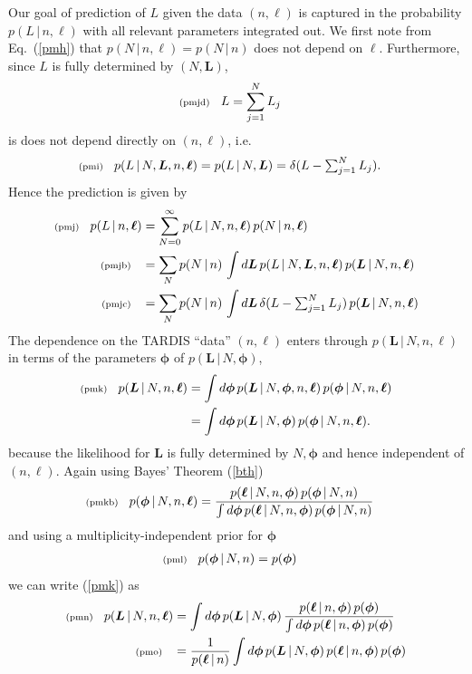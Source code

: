 \documentclass[11pt]{article}
\newcommand{\fred}[1]{\todo[inline]{#1}} %
\newcommand{\checked}{\todo[color=green,noline]{\checkmark}} %
\newcommand{\lleq}[1]{\label{#1} }
\renewcommand{\lleq}[1]{\label{#1} {\scriptstyle {\rm (#1)}} \hspace*{2ex} }
\newcommand{\cond}{\,|\,}
\newcommand{\bml}{{\bm{\ell}}}
\newcommand{\bmL}{{\bm{L}}}
\newcommand{\bmphi}{{\bm{\phi}}}
\begin{document}
Our goal of prediction of $L$ given the data $(n,\bml)$ is captured in
the probability $p(L\cond n,\bml)$ with all relevant parameters
integrated out. We first note from Eq.~(\ref{pmh}) that $p(N\cond
n,\bml) = p(N\cond n)$ does not depend on $\bml$. Furthermore, since
$L$ is fully determined by $(N,\bmL)$,
\begin{align}
  \lleq{pmjd}
  L &= \sum_{j=1}^N L_j
\end{align}
is does not depend directly on $(n,\bml)$, i.e.\
\begin{align}
  \lleq{pmi}
  p(L\cond N,\bmL,n,\bml)
  = p(L\cond N,\bmL)
  &= \delta(L - \textstyle\sum_{j=1}^N L_j).
\end{align}
\checked{}
Hence the prediction is given by
\begin{align}
  \lleq{pmj}
  p(L\cond n,\bml)
  &= \sum_{N=0}^\infty p(L\cond N,n,\bml)\,p(N\cond n,\bml) \\
  \lleq{pmjb}
  &= \sum_N p(N\cond n)\,\int d\bmL\, p(L\cond N,\bmL,n,\bml)\, p(\bmL\cond N,n,\bml)
  \\
  \lleq{pmjc}
  &= \sum_N p(N\cond n)\,\int d\bmL\,\delta(L - \textstyle\sum_{j=1}^N L_j)
  \, p(\bmL\cond N,n,\bml)
\end{align}
\checked{}
The dependence on the TARDIS ``data'' $(n,\bml)$ enters through
$p(\bmL\cond N,n,\bml)$ in terms of the parameters $\bmphi$ of
$p(\bmL\cond N,\bmphi)$,
\begin{align}
  \lleq{pmk}
  p(\bmL\cond N,n,\bml)
  &= \int d\bmphi\, p(\bmL\cond N,\bmphi,n,\bml)\,p(\bmphi\cond N,n,\bml) \\
  &= \int d\bmphi\, p(\bmL\cond N,\bmphi)\,p(\bmphi\cond N,n,\bml).
\end{align}
because the likelihood for $\bmL$ is fully determined by $N,\bmphi$
and hence independent of $(n,\bml)$.
%
Again using Bayes' Theorem (\ref{bth})
\begin{align}
  \lleq{pmkb}
  p(\bmphi\cond N,n,\bml) &=
  \frac{p(\bml\cond N,n,\bmphi)\,p(\bmphi\cond N,n)} %
  {\int d\bmphi\,p(\bml\cond N,n,\bmphi)\,p(\bmphi\cond N,n)} %
\end{align}
\fred{$p(\bmphi\cond N,n,\bml) = p(\bmphi\cond n,\bml)$ }
and using a multiplicity-independent prior for $\bmphi$
\begin{align}
  \lleq{pml}
  p(\bmphi\cond N,n) &= p(\bmphi)
\end{align}
we can write (\ref{pmk}) as
\begin{align}
  \lleq{pmn}
  p(\bmL\cond N,n,\bml)
  &= \int d\bmphi\, p(\bmL\cond N,\bmphi)\, %
  \frac{p(\bml\cond n,\bmphi)\,p(\bmphi)} %
  {\int d\bmphi\,p(\bml\cond n,\bmphi)\,p(\bmphi)} \\
  \lleq{pmo}
  &= \frac{1}  {p(\bml\cond n)} %
  \int d\bmphi\, p(\bmL\cond N,\bmphi)\, %
  p(\bml\cond n,\bmphi)\,p(\bmphi)
\end{align}
\end{document}
